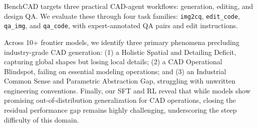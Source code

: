 BenchCAD targets three practical CAD-agent workflows: generation, editing, and design QA. We evaluate these through four task families: \texttt{img2cq}, \texttt{edit\_code}, \texttt{qa\_img}, and \texttt{qa\_code}, with expert-annotated QA pairs and edit instructions.

Across 10+ frontier models, we identify three primary phenomena precluding industry-grade CAD generation: (1) a Holistic Spatial and Detailing Deficit, capturing global shapes but losing local details; (2) a CAD Operational Blindspot, failing on essential modeling operations; and (3) an Industrial Common Sense and Parametric Abstraction Gap, struggling with unwritten engineering conventions. Finally, our SFT and RL reveal that while models show promising out-of-distribution generalization for CAD operations, closing the residual performance gap remains highly challenging, underscoring the steep difficulty of this domain.


